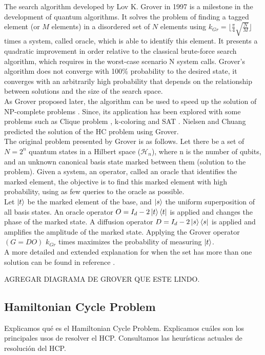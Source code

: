 \documentclass[10pt,a4paper]{article}
\begin{document}
The search algorithm developed by Lov K. Grover in 1997 \cite{Grover1} is a milestone in the development of quantum algorithms. It solves the problem of finding a tagged element (or $M$ elements) in a disordered set of $N$ elements using $k_{Gr}= \lfloor\frac{\pi}{4} \sqrt{\frac{N}{M}}\rfloor$ times a system, called oracle, which is able to identify this element. It presents a quadratic improvement in order relative to the classical brute-force search algorithm, which requires in the worst-case scenario N system calls. Grover's algorithm does not converge with 100\% probability to the desired state, it converges with an arbitrarily high probability that depends on the relationship between solutions and the size of the search space.\\
As Grover proposed later, the algorithm can be used to speed up the solution of NP-complete problems \cite{Grover2}. Since, its application has been explored with some problems such as Clique problem \cite{Clique, Clique2}, k-coloring \cite{Coloring1, Coloring2} and SAT \cite{SAT_ions, SAT_paralel}. Nielsen and Chuang predicted the solution of the HC problem using Grover\cite{Nielsen_Chuang_2010}.\\
The original problem presented by Grover \cite{Grover1} is as follows. Let there be a set of $N = 2^n$ quantum states in a Hilbert space ($\mathcal{H}_n$), where n is the number of qubits, and an unknown canonical basis state marked between them (solution to the problem). Given a system, an operator, called an oracle that identifies the marked element, the objective is to find this marked element with high probability, using as few queries to the oracle as possible.\\
Let $\ket{t}$ be the marked element of the base, and $\ket{s}$ the uniform superposition of all basis states. An oracle operator $O = I_d - 2\ket{t}\bra{t}$ is applied and changes the phase of the marked state. A diffusion operator $D = I_d - 2\ket{s}\bra{s}$ is applied and amplifies the amplitude of the marked state. Applying the Grover operator $(G=DO)$ $k_{Gr}$ times maximizes the probability of measuring $\ket{t}$.\\
A more detailed and extended explanation for when the set has more than one solution can be found in reference \cite{Nielsen_Chuang_2010}.

AGREGAR DIAGRAMA DE GROVER QUE ESTE LINDO.

\subsection{Hamiltonian Cycle Problem}
Explicamos qué es el Hamiltonian Cycle Problem.
Explicamos cuáles son los principales usos de resolver el HCP.
Consultamos las heurísticas actuales de resolución del HCP.
\end{document}
